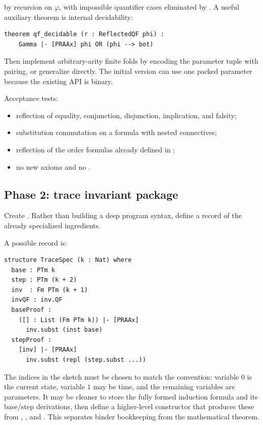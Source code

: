 by recursion on \(\varphi\), with impossible quantifier cases eliminated by
.  A useful auxiliary theorem is internal decidability:

\begin{lstlisting}[language={}]
theorem qf_decidable (r : ReflectedQF phi) :
    Gamma |- [PRAAx] phi OR (phi --> bot)
\end{lstlisting}

Then implement arbitrary-arity finite folds by encoding the parameter tuple
with pairing, or generalize  directly.  The initial version can
use one packed parameter because the existing  API is binary.

Acceptance tests:
\begin{itemize}
\item reflection of equality, conjunction, disjunction, implication, and
falsity;
\item substitution commutation on a formula with nested connectives;
\item reflection of the order formulas already defined in ;
\item no new axioms and no .
\end{itemize}

\subsection{Phase 2: trace invariant package}

Create .  Rather than building a deep program
syntax, define a record of the already specialized ingredients.

A possible record is:

\begin{lstlisting}[language={}]
structure TraceSpec (k : Nat) where
  base : PTm k
  step : PTm (k + 2)
  inv  : Fm PTm (k + 1)
  invQF : inv.QF
  baseProof :
    ([] : List (Fm PTm k)) |- [PRAAx]
      inv.subst (inst base)
  stepProof :
    [inv] |- [PRAAx]
      inv.subst (repl (step.subst ...))
\end{lstlisting}

The indices in the sketch must be chosen to match the convention:
variable \(0\) is the current state, variable \(1\) may be time, and the
remaining variables are parameters.  It may be cleaner to store the fully
formed induction formula  and its base/step
derivations, then define a higher-level constructor that produces these from
, , and .  This separates binder bookkeeping
from the mathematical theorem.

